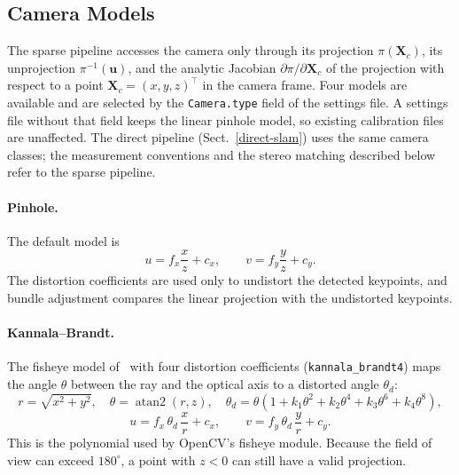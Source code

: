 \documentclass{article}
\let\oldparagraph\paragraph
\renewcommand{\paragraph}[1]{\oldparagraph{#1}\mbox{}}
\begin{document}
\hypertarget{camera-models}{%
\subsection{Camera Models}\label{camera-models}}

The sparse pipeline accesses the camera only through its projection $\pi(\mathbf{X}_c)$, its unprojection $\pi^{-1}(\mathbf{u})$, and the analytic Jacobian $\partial \pi / \partial \mathbf{X}_c$ of the projection with respect to a point $\mathbf{X}_c = (x, y, z)^\top$ in the camera frame. Four models are available and are selected by the \texttt{Camera.type} field of the settings file. A settings file without that field keeps the linear pinhole model, so existing calibration files are unaffected. The direct pipeline (Sect.~\ref{direct-slam}) uses the same camera classes; the measurement conventions and the stereo matching described below refer to the sparse pipeline.

\paragraph{Pinhole.} The default model is
\begin{equation}
u = f_x \frac{x}{z} + c_x, \qquad v = f_y \frac{y}{z} + c_y .
\end{equation}
The distortion coefficients are used only to undistort the detected keypoints, and bundle adjustment compares the linear projection with the undistorted keypoints.

\paragraph{Kannala--Brandt.} The fisheye model of~\cite{kannala2006generic} with four distortion coefficients (\texttt{kannala\_brandt4}) maps the angle $\theta$ between the ray and the optical axis to a distorted angle $\theta_d$:
\begin{equation}
r = \sqrt{x^2 + y^2}, \quad \theta = \operatorname{atan2}(r, z), \quad
\theta_d = \theta \left(1 + k_1 \theta^2 + k_2 \theta^4 + k_3 \theta^6 + k_4 \theta^8\right),
\end{equation}
\begin{equation}
u = f_x \, \theta_d \, \frac{x}{r} + c_x, \qquad v = f_y \, \theta_d \, \frac{y}{r} + c_y .
\end{equation}
This is the polynomial used by OpenCV's fisheye module. Because the field of view can exceed $180^\circ$, a point with $z < 0$ can still have a valid projection.
\end{document}
